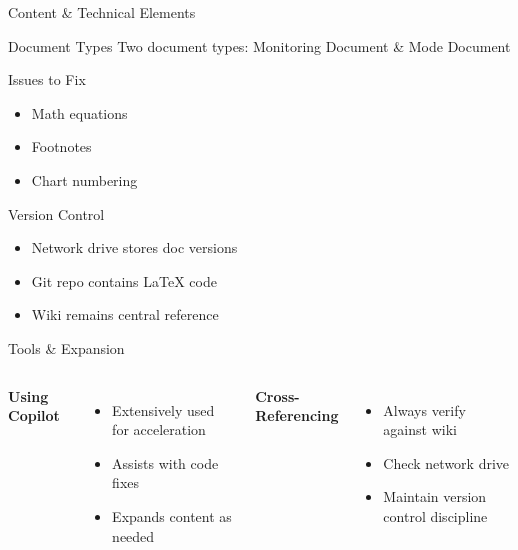 \documentclass{beamer}
\begin{document}
	\begin{frame}{Content \& Technical Elements}
		\begin{block}{Document Types}
			Two document types: Monitoring Document \& Mode Document
		\end{block}
		
		\begin{alertblock}{Issues to Fix}
			\begin{itemize}
				\item Math equations
				\item Footnotes
				\item Chart numbering
			\end{itemize}
		\end{alertblock}
		
		\begin{exampleblock}{Version Control}
			\begin{itemize}
				\item Network drive stores doc versions
				\item Git repo contains \LaTeX{} code
				\item Wiki remains central reference
			\end{itemize}
		\end{exampleblock}
	\end{frame}
	
	\begin{frame}{Tools \& Expansion}
		\begin{columns}
			\textbf{Using Copilot}
			\begin{itemize}
				\item Extensively used for acceleration
				\item Assists with code fixes
				\item Expands content as needed
			\end{itemize}
			\textbf{Cross-Referencing}
			\begin{itemize}
				\item Always verify against wiki
				\item Check network drive
				\item Maintain version control discipline
			\end{itemize}
		\end{columns}
	\end{frame}
	
\end{document}

